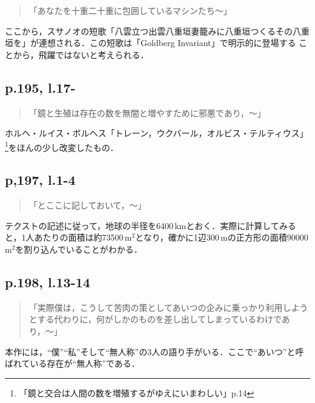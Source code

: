 \documentclass[10pt, a5paper, twoside]{ltjsarticle}
\begin{document}
            \begin{quote}
                「あなたを十重二十重に包囲しているマシンたち〜」
            \end{quote}

            ここから，スサノオの短歌「八雲立つ出雲八重垣妻籠みに八重垣つくるその八重垣を」\cite{kojiki}が連想される．この短歌は「Goldberg Invariant」で明示的に登場する%
            ことから，飛躍ではないと考えられる．

        \subsection{p.195, l.17-}

            \begin{quote}
                「鏡と生殖は存在の数を無闇と増やすために邪悪であり，〜」
            \end{quote}

            ホルヘ・ルイス・ボルヘス「トレーン，ウクバール，オルビス・テルティウス」\footnote{「鏡と交合は人間の数を増殖するがゆえにいまわしい」\cite{fictions}p.14}をほんの少し改変したもの．

        \subsection{p,197, l.1-4}

            \begin{quote}
                「とここに記しておいて，〜」
            \end{quote}

            テクストの記述に従って，地球の半径を6400\,kmとおく．実際に計算してみると，1人あたりの面積は約73500\,$\mathrm{m}^2$となり，確かに1辺300\,mの正方形の面積90000\,$\mathrm{m}^2$を割り込んでいることがわかる．

        \subsection{p.198, l.13-14}

            \begin{quote}
                「実際僕は，こうして苦肉の策としてあいつの企みに乗っかり利用しようとする代わりに，何がしかのものを差し出してしまっているわけであり，〜」
            \end{quote}

            本作には，“僕”“私”そして“無人称”の3人の語り手がいる．ここで“あいつ”と呼ばれている存在が“無人称”である．
\end{document}
